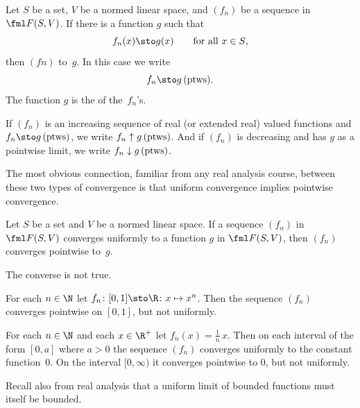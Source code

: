 \begin{defn}  Let $S$ be a set, $V$ be a normed linear space, and $(f_n)$ be a sequence in
$\fml F(S,V)$.  If there is a function $g$ such that
  \[ f_n(x) \sto g(x) \qquad  \text{for all $x \in S$}, \]
then $(fn)$
 to~$g$.  In this case we write
  \[ f_n \sto g \text{\,(ptws)}. \]
The function $g$ is the
 of the~$f_n$'s.

If $(f_n)$ is an increasing sequence of real (or extended real) valued functions and $f_n
\sto g \text{\,(ptws)}$, we write
$f_n \uparrow g \text{\,(ptws)}$. And if $(f_n)$ is decreasing and has $g$ as a pointwise
limit, we write
$f_n \downarrow g \text{\,(ptws)}$.
\end{defn}

The most obvious connection, familiar from any real analysis course, between these two types of convergence is that uniform
convergence implies pointwise convergence.

\begin{prop}\label{C023141} Let $S$ be a set and $V$ be a normed linear space.  If a sequence $(f_n)$ in $\fml F(S,V)$
converges uniformly to a function $g$ in $\fml F(S,V)$, then $(f_n)$ converges pointwise to~$g$.
\end{prop}

The converse is not true.

\begin{exam}  For each $n \in \N$ let $f_n\colon [0,1] \sto \R\colon x \mapsto x^n$. Then the
sequence $(f_n)$ converges pointwise on $[0,1]$, but not uniformly.
\end{exam}

\begin{exam} For each $n \in \N$ and each $x \in \R^+$ let $f_n(x) = \frac1n\, x$.  Then on
each interval of the form $[0,a]$ where $a > 0$ the sequence $(f_n)$ converges uniformly
to the constant function~$0$.  On the interval $[0,\infty)$ it converges pointwise to
$0$, but not uniformly.
\end{exam}

Recall also from real analysis that a uniform limit of bounded functions must itself be bounded.

